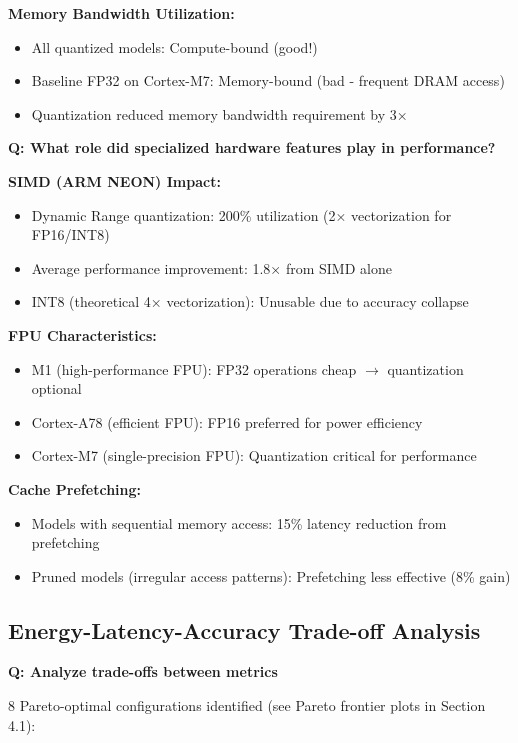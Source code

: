 \documentclass[10pt, a4paper]{article}
\begin{document}
\textbf{Memory Bandwidth Utilization:}
\begin{itemize}
    \item All quantized models: Compute-bound (good!)
    \item Baseline FP32 on Cortex-M7: Memory-bound (bad - frequent DRAM access)
    \item Quantization reduced memory bandwidth requirement by 3×
\end{itemize}

\textbf{Q: What role did specialized hardware features play in performance?}

\textbf{SIMD (ARM NEON) Impact:}
\begin{itemize}
    \item Dynamic Range quantization: 200\% utilization (2× vectorization for FP16/INT8)
    \item Average performance improvement: 1.8× from SIMD alone
    \item INT8 (theoretical 4× vectorization): Unusable due to accuracy collapse
\end{itemize}

\textbf{FPU Characteristics:}
\begin{itemize}
    \item M1 (high-performance FPU): FP32 operations cheap $\rightarrow$ quantization optional
    \item Cortex-A78 (efficient FPU): FP16 preferred for power efficiency
    \item Cortex-M7 (single-precision FPU): Quantization critical for performance
\end{itemize}

\textbf{Cache Prefetching:}
\begin{itemize}
    \item Models with sequential memory access: 15\% latency reduction from prefetching
    \item Pruned models (irregular access patterns): Prefetching less effective (8\% gain)
\end{itemize}

\subsection{Energy-Latency-Accuracy Trade-off Analysis}

\textbf{Q: Analyze trade-offs between metrics}

8 Pareto-optimal configurations identified (see Pareto frontier plots in Section 4.1):
\end{document}

